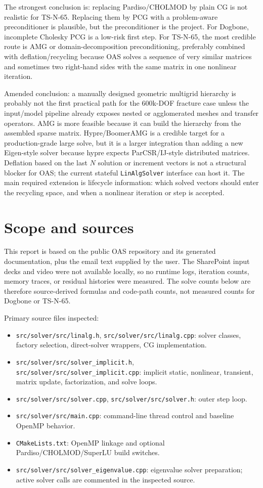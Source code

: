 \documentclass[10pt,a4paper]{article}
\newcommand{\code}[1]{\texttt{#1}}
\begin{document}
The strongest conclusion is: replacing Pardiso/CHOLMOD by plain CG is not realistic for TS-N-65. Replacing them by PCG with a problem-aware preconditioner is plausible, but the preconditioner is the project. For Dogbone, incomplete Cholesky PCG is a low-risk first step. For TS-N-65, the most credible route is AMG or domain-decomposition preconditioning, preferably combined with deflation/recycling because OAS solves a sequence of very similar matrices and sometimes two right-hand sides with the same matrix in one nonlinear iteration.

Amended conclusion: a manually designed geometric multigrid hierarchy is probably not the first practical path for the 600k-DOF fracture case unless the input/model pipeline already exposes nested or agglomerated meshes and transfer operators. AMG is more feasible because it can build the hierarchy from the assembled sparse matrix. Hypre/BoomerAMG is a credible target for a production-grade large solve, but it is a larger integration than adding a new Eigen-style solver because hypre expects ParCSR/IJ-style distributed matrices. Deflation based on the last $N$ solution or increment vectors is not a structural blocker for OAS; the current stateful \code{LinAlgSolver} interface can host it. The main required extension is lifecycle information: which solved vectors should enter the recycling space, and when a nonlinear iteration or step is accepted.

\section{Scope and sources}

This report is based on the public OAS repository and its generated documentation, plus the email text supplied by the user. The SharePoint input decks and video were not available locally, so no runtime logs, iteration counts, memory traces, or residual histories were measured. The solve counts below are therefore source-derived formulas and code-path counts, not measured counts for Dogbone or TS-N-65.

Primary source files inspected:
\begin{itemize}
  \item \code{src/solver/src/linalg.h}, \code{src/solver/src/linalg.cpp}: solver classes, factory selection, direct-solver wrappers, CG implementation.
  \item \code{src/solver/src/solver\_implicit.h}, \code{src/solver/src/solver\_implicit.cpp}: implicit static, nonlinear, transient, matrix update, factorization, and solve loops.
  \item \code{src/solver/src/solver.cpp}, \code{src/solver/src/solver.h}: outer step loop.
  \item \code{src/solver/src/main.cpp}: command-line thread control and baseline OpenMP behavior.
  \item \code{CMakeLists.txt}: OpenMP linkage and optional Pardiso/CHOLMOD/SuperLU build switches.
  \item \code{src/solver/src/solver\_eigenvalue.cpp}: eigenvalue solver preparation; active solver calls are commented in the inspected source.
\end{itemize}
\end{document}
